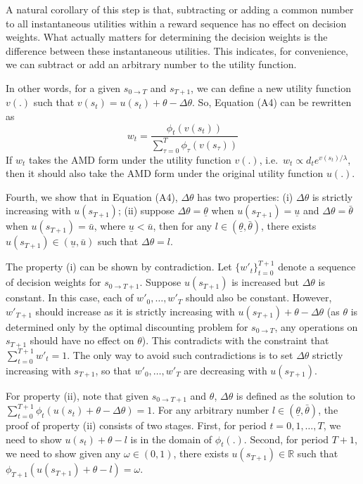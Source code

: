 \documentclass[
  12pt,
]{article}
\begin{document}
A natural corollary of this step is that, subtracting or adding a common
number to all instantaneous utilities within a reward sequence has no
effect on decision weights. What actually matters for determining the
decision weights is the difference between these instantaneous
utilities. This indicates, for convenience, we can subtract or add an
arbitrary number to the utility function.

In other words, for a given \(s_{0\rightarrow T}\) and \(s_{T+1}\), we
can define a new utility function \(v(.)\) such that
\(v(s_t) = u(s_t) +\theta-\Delta \theta\). So, Equation (A4) can be
rewritten as\[\tag{A5}
w_t = \frac{\phi_t(v(s_t))}{\sum_{\tau=0}^{T}\phi_\tau(v(s_\tau))}
\]If \(w_t\) takes the AMD form under the utility function \(v(.)\),
i.e.~\(w_t \propto d_t e^{v(s_t)/\lambda}\), then it should also take
the AMD form under the original utility function \(u(.)\).

Fourth, we show that in Equation (A4), \(\Delta \theta\) has two
properties: (i) \(\Delta \theta\) is strictly increasing with
\(u(s_{T+1})\); (ii) suppose \(\Delta \theta = \underline{\theta}\) when
\(u(s_{T+1})=\underline{u}\) and \(\Delta\theta=\bar{\theta}\) when
\(u(s_{T+1})=\bar{u}\), where \(\underline{u}<\bar{u}\), then for any
\(l \in(\underline{\theta},\bar{\theta})\), there exists
\(u(s_{T+1})\in(\underline{u},\bar{u})\) such that
\(\Delta \theta = l\).

The property (i) can be shown by contradiction. Let
\(\{w'_t\}_{t=0}^{T+1}\) denote a sequence of decision weights for
\(s_{0\rightarrow T+1}\). Suppose \(u(s_{T+1})\) is increased but
\(\Delta \theta\) is constant. In this case, each of \(w'_0,…,w'_T\)
should also be constant. However, \(w'_{T+1}\) should increase as it is
strictly increasing with \(u(s_{T+1})+\theta-\Delta \theta\) (as
\(\theta\) is determined only by the optimal discounting problem for
\(s_{0\rightarrow T}\), any operations on \(s_{T+1}\) should have no
effect on \(\theta\)). This contradicts with the constraint that
\(\sum_{t=0}^{T+1} w'_t =1\). The only way to avoid such contradictions
is to set \(\Delta \theta\) strictly increasing with \(s_{T+1}\), so
that \(w'_0,…,w'_T\) are decreasing with \(u(s_{T+1})\).

For property (ii), note that given \(s_{0\rightarrow T+1}\) and
\(\theta\), \(\Delta\theta\) is defined as the solution to
\(\sum_{t=0}^{T+1} \phi_t(u(s_t)+\theta-\Delta\theta)=1\). For any
arbitrary number \(l\in(\underline{\theta},\bar{\theta})\), the proof of
property (ii) consists of two stages. First, for period \(t=0,1,…,T\),
we need to show \(u(s_t)+\theta-l\) is in the domain of \(\phi_t(.)\).
Second, for period \(T+1\), we need to show given any
\(\omega\in(0,1)\), there exists \(u(s_{T+1})\in \mathbb{R}\) such that
\(\phi_{T+1}(u(s_{T+1})+\theta-l)=\omega\).
\end{document}
